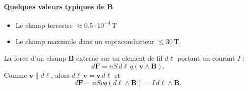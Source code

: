 \paragraph{Quelques valeurs typiques de $\boldsymbol{B}$}
\begin{itemize}
\item Le champ terrestre $\approx 0.5\cdot10^{-4}\,\mathrm{T}$
\item Le champ maximale dans un supraconducteur $\le 30\,\mathrm{T}$.
\end{itemize}

La force d'un champ $\boldsymbol{B}$ externe sur un element de fil $d\boldsymbol{\ell }$ portant un courant $I$ :
$$
d\boldsymbol{F}=nS\,d \ell\, q(\boldsymbol{v}\land \boldsymbol{B}).
$$
Comme $\boldsymbol{v}\parallel d\boldsymbol{\ell}$, alors $d \ell\,\boldsymbol{v}=\boldsymbol{v}\,d\boldsymbol{\ell}$ et
$$
d\boldsymbol{F}=nSvq(d\boldsymbol{\ell}\land \boldsymbol{B})=I\,d\boldsymbol{\ell}\land \boldsymbol{B}.
$$
